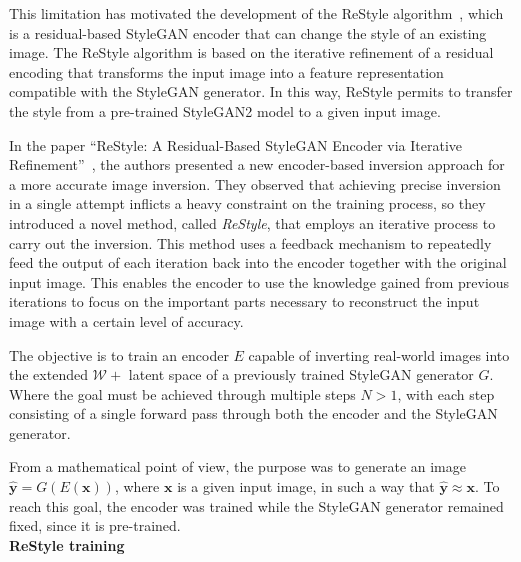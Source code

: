 \noindent This limitation has motivated the development of the ReStyle algorithm~\cite{alaluf2021restyle}, which is a residual-based StyleGAN encoder that can change the style of an existing image. The ReStyle algorithm is based on the iterative refinement of a residual encoding that transforms the input image into a feature representation compatible with the StyleGAN generator. In this way, ReStyle permits to transfer the style from a pre-trained StyleGAN2 model to a given input image.

\noindent In the paper “ReStyle: A Residual-Based StyleGAN Encoder via Iterative Refinement”~\cite{alaluf2021restyle}, the authors presented a new encoder-based inversion approach for a more accurate image inversion. They observed that achieving precise inversion in a single attempt inflicts a heavy constraint on the training process, so they introduced a novel method, called \textit{ReStyle}, that employs an iterative process to carry out the inversion. This method uses a feedback mechanism to repeatedly feed the output of each iteration back into the encoder together with the original input image. This enables the encoder to use the knowledge gained from previous iterations to focus on the important parts necessary to reconstruct the input image with a certain level of accuracy.

\noindent The objective is to train an encoder $E$ capable of inverting real-world images into the extended $\mathcal{W}+$ latent space of a previously trained StyleGAN generator $G$. Where the goal must be achieved through multiple steps $N>1$, with each step consisting of a single forward pass through both the encoder and the StyleGAN generator.

\noindent From a mathematical point of view, the purpose was to generate an image $\hat{\textbf{y}} = G(E(\textbf{x}))$, where $\textbf{x}$ is a given input image, in such a way that $\hat{\textbf{y}} \approx \textbf{x}$. To reach this goal, the encoder was trained while the StyleGAN generator remained fixed, since it is pre-trained.\\

\noindent \textbf{ReStyle training}

